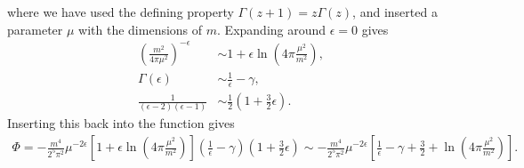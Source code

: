 where we have used the defining property $\Gamma(z + 1) = z\Gamma(z)$, and inserted a parameter $\mu$ with the dimensions of $m$.
Expanding around $\epsilon = 0$ gives
\begin{align}
    \left(\frac{m^2}{4 \pi \mu^2}\right)^{- \epsilon}
    &\sim 1 + \epsilon \ln\left(4 \pi \frac{\mu^2}{m^2}\right),\\
    \Gamma(\epsilon) 
    & \sim \frac{1}{\epsilon} - \gamma, \\
    \frac{1}{(\epsilon - 2)(\epsilon - 1)}
    &\sim \frac{1}{2}\left(1 + \frac{3}{2} \epsilon\right).
\end{align}
Inserting this back into the function gives
\begin{align}
    \Phi = 
    - \frac{m^4}{2^5 \pi^2} \mu^{-2 \epsilon}
    \left[1 + \epsilon \ln\left(4 \pi \frac{\mu^2}{m^2}\right)\right]
    \left(\frac{1}{\epsilon} - \gamma\right) \left(1 + \frac{3}{2} \epsilon\right)
    \sim
    - \frac{m^4}{2^5 \pi^2} \mu^{-2 \epsilon}
    \left[
        \frac{1}{\epsilon} 
        - \gamma + \frac{3}{2}
        + \ln\left(4 \pi \frac{\mu^2}{m^2}\right)
    \right].
\end{align}
